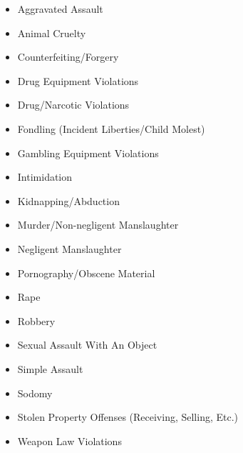 \documentclass[
]{krantz}
\providecommand{\tightlist}{%
  \setlength{\itemsep}{0pt}\setlength{\parskip}{0pt}}
\begin{document}
\begin{itemize}
\tightlist
\item
  Aggravated Assault
\item
  Animal Cruelty
\item
  Counterfeiting/Forgery
\item
  Drug Equipment Violations
\item
  Drug/Narcotic Violations
\item
  Fondling (Incident Liberties/Child Molest)
\item
  Gambling Equipment Violations
\item
  Intimidation
\item
  Kidnapping/Abduction
\item
  Murder/Non-negligent Manslaughter
\item
  Negligent Manslaughter
\item
  Pornography/Obscene Material
\item
  Rape
\item
  Robbery
\item
  Sexual Assault With An Object
\item
  Simple Assault
\item
  Sodomy
\item
  Stolen Property Offenses (Receiving, Selling, Etc.)
\item
  Weapon Law Violations
\end{itemize}
\end{document}
